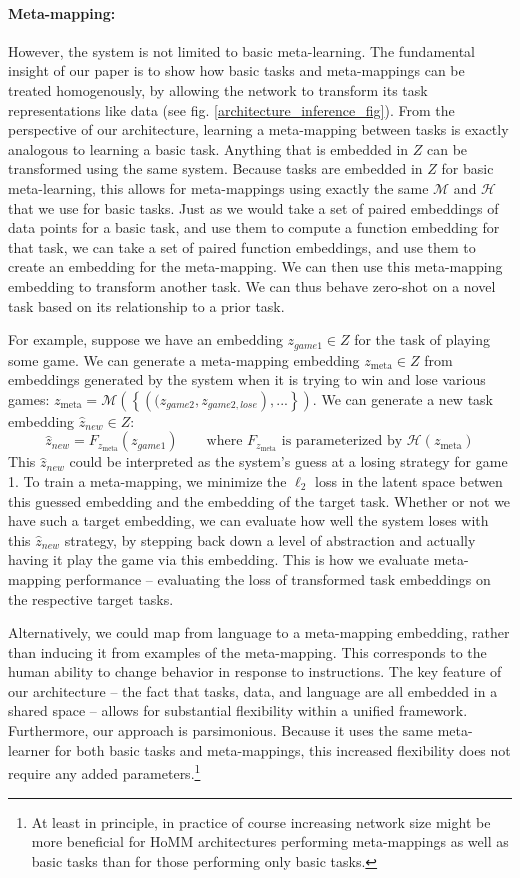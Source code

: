 \documentclass{article}
\begin{document}
\paragraph{Meta-mapping:} However, the system is not limited to basic meta-learning. The fundamental insight of our paper is to show how basic tasks and meta-mappings can be treated homogenously, by allowing the network to transform its task representations like data (see fig. \ref{architecture_inference_fig}). From the perspective of our architecture, learning a meta-mapping between tasks is exactly analogous to learning a basic task. Anything that is embedded in $Z$ can be transformed using the same system. Because tasks are embedded in $Z$ for basic meta-learning, this allows for meta-mappings using exactly the same $\mathcal{M}$ and $\mathcal{H}$ that we use for basic tasks. Just as we would take a set of paired embeddings of data points for a basic task, and use them to compute a function embedding for that task, we can take a set of paired function embeddings, and use them to create an embedding for the meta-mapping. We can then use this meta-mapping embedding to transform another task. We can thus behave zero-shot on a novel task based on its relationship to a prior task. \par
For example, suppose we have an embedding $z_{game1} \in Z$ for the task of playing some game. We can generate a meta-mapping embedding $z_{\text{meta}} \in Z$ from embeddings generated by the system when it is trying to win and lose various games: $z_{\text{meta}} = \mathcal{M}\left( \left\{\left((z_{game2},z_{game2,lose}\right), ... \right\}\right)$. We can generate a new task embedding $\hat{z}_{new} \in Z$:  
\[\hat{z}_{new} = F_{z_{\text{meta}}}(z_{game1}) \qquad \text{where } F_{z_{\text{meta}}} \text{ is parameterized by } \mathcal{H}\left(z_{\text{meta}}\right)\]
This $\hat{z}_{new}$ could be interpreted as the system's guess at a losing strategy for game 1. To train a meta-mapping, we minimize the $\ell_2$ loss in the latent space betwen this guessed embedding and the embedding of the target task. Whether or not we have such a target embedding, we can evaluate how well the system loses with this $\hat{z}_{new}$ strategy, by stepping back down a level of abstraction and actually having it play the game via this embedding. This is how we evaluate meta-mapping performance -- evaluating the loss of transformed task embeddings on the respective target tasks. \par
Alternatively, we could map from language to a meta-mapping embedding, rather than inducing it from examples of the meta-mapping. This corresponds to the human ability to change behavior in response to instructions. The key feature of our architecture -- the fact that tasks, data, and language are all embedded in a shared space -- allows for substantial flexibility within a unified framework. Furthermore, our approach is parsimonious. Because it uses the same meta-learner for both basic tasks and meta-mappings, this increased flexibility does not require any added parameters.\footnote{At least in principle, in practice of course increasing network size might be more beneficial for HoMM architectures performing meta-mappings as well as basic tasks than for those performing only basic tasks.}  
\end{document}
